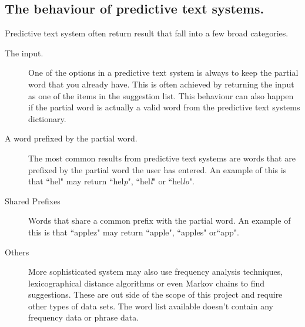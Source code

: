 \documentclass[10pt]{article} %
\begin{document}
		\subsection{The behaviour of predictive text systems.}
			Predictive text system often return result that fall into a few broad categories.
			\begin{description}
				\item [The input.] One of the options in a predictive text system is always to keep the partial word that you already have. This is often achieved by returning the input as one of the items in the suggestion list. This behaviour can also happen if the partial word is actually a valid word from the predictive text systems dictionary.
				\item [A word prefixed by the partial word.] The most common results from predictive text systems are words that are prefixed by the partial word the user has entered. An example of this is that ``hel" may return ``hel\textit{p}", ``hel\textit{l}" or ``hel\textit{lo}". 
				\item [Shared Prefixes] Words that share a common prefix with the partial word. An example of this is that ``applez" may return ``apple", ``apples" or``app". 
				\item[Others] 
				More sophisticated system may also use frequency analysis techniques, lexicographical distance algorithms or even Markov chains to find suggestions. These are out side of the scope of this project and require other types of data sets. The word list available doesn't contain any frequency data or phrase data.
			\end{description}
\end{document}
